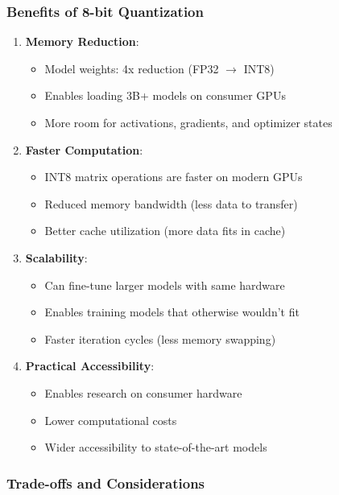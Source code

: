 \documentclass[conference]{IEEEtran}
\begin{document}
\subsubsection{Benefits of 8-bit Quantization}

\begin{enumerate}
    \item \textbf{Memory Reduction}:
    \begin{itemize}
        \item Model weights: 4x reduction (FP32 $\rightarrow$ INT8)
        \item Enables loading 3B+ models on consumer GPUs
        \item More room for activations, gradients, and optimizer states
    \end{itemize}
    
    \item \textbf{Faster Computation}:
    \begin{itemize}
        \item INT8 matrix operations are faster on modern GPUs
        \item Reduced memory bandwidth (less data to transfer)
        \item Better cache utilization (more data fits in cache)
    \end{itemize}
    
    \item \textbf{Scalability}:
    \begin{itemize}
        \item Can fine-tune larger models with same hardware
        \item Enables training models that otherwise wouldn't fit
        \item Faster iteration cycles (less memory swapping)
    \end{itemize}
    
    \item \textbf{Practical Accessibility}:
    \begin{itemize}
        \item Enables research on consumer hardware
        \item Lower computational costs
        \item Wider accessibility to state-of-the-art models
    \end{itemize}
\end{enumerate}

\subsubsection{Trade-offs and Considerations}
\end{document}
